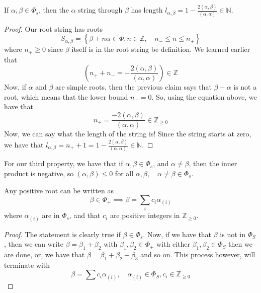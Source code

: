 \begin{claim}
If $ \alpha , \beta \in \Phi_ s $, then 
the $ \alpha $ string through $ \beta $ 
has length $ l_{\alpha, \beta }  = 1 - \frac{ 2 \left(  \alpha, \beta  \right)  }{ (\alpha, \alpha)   }
\in \mathbb{ N } $. 
\begin{proof}
	Our root string has roots 
	\[
	 S_{ \alpha, \beta }  = 
	 \left\{  \beta + n \alpha \in \Phi , 
	 n \in \mathbb{ Z}, \quad  n_ - \leq n \leq n _ + \right\} 
	\] where $ n _ +  \geq 0 $  since 
	$ \beta $ itself is in the root 
	string be definition. We learned earlier that 
	\[
		\left(  n _ + + n _ -  = - \frac{ 2 \left(  \alpha, \beta  \right)  }{ 
		\left(  \alpha, \alpha  \right)  }  \right)  \in \mathbb{ Z} 
	\] Now, if $ \alpha $ and $ \beta $ 
	are simple roots, then the previous claim says 
	that $ \beta - \alpha $ is not a root, 
	which means that the lower bound $ n_ - = 0 $. 
	So, using the equation above, 
	we have that 
	\[
		n _ + = \frac{ - 2 \left(  \alpha, \beta  \right)  }{ \left(  
		\alpha, \alpha \right)  } \in \mathbb{ Z} _{ \geq  0 } 
	\] Now, we can say what the length of the string is!
	Since the string starts at zero, we have that 
	$ l _{ \alpha , \beta }  = n _ + + 1    = 1 - \frac{ 2 \left(  \alpha, \beta  \right)  }{ 
	\left(  \alpha, \alpha  \right)  } \in \mathbb{ N } $.  
\end{proof}
\end{claim}

\begin{claim}
For our third property, we have that if 
$ \alpha, \beta \in \Phi _ s $, and $ \alpha \neq \beta $, 
then the inner product is negative, so $ \left(  \alpha, \beta  \right)  \leq 0 $
for all $ \alpha, \beta, \quad \alpha \neq \beta  \in \Phi _ s $. 
\end{claim}

\begin{claim}
Any positive root can be written as 
\[
 \beta \in \Phi _ + \implies 
 \beta = \sum_ i c _ i \alpha _{ ( i )   } 
\]  where $ \alpha _{ ( i )   } $ are 
in $ \Phi _ s $, and that $ c _ i $ are positive 
integers in $ \mathbb{ Z} _{ \geq 0  } $. 
\begin{proof}
 The statement is clearly true if $ \beta \in \Phi _ s $. 
  Now, if we have that $ \beta $ is not in $ \Phi  _ S  $, then 
  we can write $ \beta = \beta _ 1 + \beta _  2 $ with 
  $ \beta_ 1 , \beta_2 \in \Phi  _ +  $  with either 
  $ \beta_1 , \beta _ 2 \in \Phi  _ S $ then we are done, 
  or, we have that $ \beta = \beta _ 1 + \beta _ 2 + \beta _ 3 $
  and so on. This process however, will terminate with 
  \[
	  \beta = \sum c_ i \alpha _{ \left(  i  \right)  } , \quad 
	  \alpha _{ ( i )   } \in \Phi  _  S , c _i \in \mathbb{ Z}_{ \geq 0 }
  \] 
\end{proof}
\end{claim}

